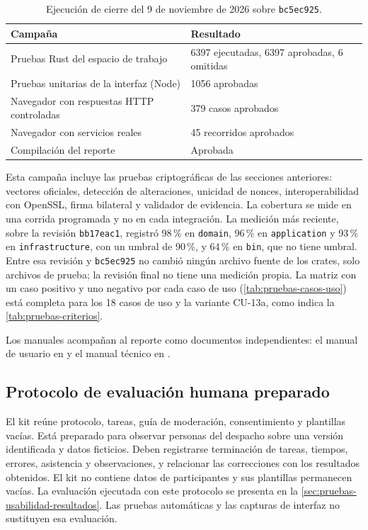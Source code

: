 \begin{table}[H]
  \centering
  \caption{Ejecución de cierre del 9 de noviembre de 2026 sobre \texttt{bc5ec925}.}
  \label{tab:pruebas-ejecucion-cierre}
  \begin{tabular}{@{}p{}p{}@{}}
    \toprule
    \textbf{Campaña} & \textbf{Resultado} \\
    \midrule
    Pruebas Rust del espacio de trabajo & 6397 ejecutadas, 6397 aprobadas, 6 omitidas \\
    Pruebas unitarias de la interfaz (Node) & 1056 aprobadas \\
    Navegador con respuestas HTTP controladas & 379 casos aprobados \\
    Navegador con servicios reales & 45 recorridos aprobados \\
    Compilación del reporte & Aprobada \\
    \bottomrule
  \end{tabular}
\end{table}

Esta campaña incluye las pruebas criptográficas de las secciones anteriores:
vectores oficiales, detección de alteraciones, unicidad de nonces,
interoperabilidad con OpenSSL, firma bilateral y validador de evidencia. La
cobertura se mide en una corrida programada y no en cada integración. La
medición más reciente, sobre la revisión \texttt{bb17eac1}, registró 98\,\% en
\texttt{domain}, 96\,\% en \texttt{application} y 93\,\% en
\texttt{infrastructure}, con un umbral de 90\,\%, y 64\,\% en \texttt{bin}, que
no tiene umbral. Entre esa revisión y \texttt{bc5ec925} no cambió ningún
archivo fuente de los crates, solo archivos de prueba; la revisión final no
tiene una medición propia. La matriz con un caso positivo y uno negativo por
cada caso de uso (\cref{tab:pruebas-casos-uso}) está completa para los 18 casos de
uso y la variante CU-13a, como indica la \cref{tab:pruebas-criterios}.

Los manuales acompañan al reporte como documentos independientes: el manual de
usuario en  y el manual técnico en
.

\subsection{Protocolo de evaluación humana preparado}\label{sec:pruebas-protocolo-humano}
El kit  reúne protocolo, tareas, guía de
moderación, consentimiento y plantillas vacías. Está preparado para observar
personas del despacho sobre una versión identificada y datos ficticios. Deben
registrarse terminación de tareas, tiempos, errores, asistencia y observaciones,
y relacionar las correcciones con los resultados obtenidos. El kit no contiene
datos de participantes y sus plantillas permanecen vacías. La evaluación
ejecutada con este protocolo se presenta en la
\cref{sec:pruebas-usabilidad-resultados}. Las pruebas automáticas y las
capturas de interfaz no sustituyen esa evaluación.

